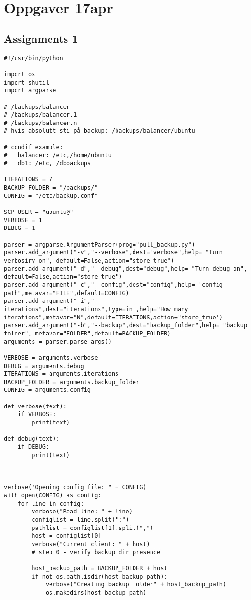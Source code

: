 \section{Oppgaver 17apr}

\subsection{Assignments 1} 
\begin{lstlisting}
#!/usr/bin/python

import os
import shutil
import argparse

# /backups/balancer
# /backups/balancer.1
# /backups/balancer.n
# hvis absolutt sti på backup: /backups/balancer/ubuntu

# condif example:
#   balancer: /etc,/home/ubuntu
#   db1: /etc, /dbbackups

ITERATIONS = 7
BACKUP_FOLDER = "/backups/"
CONFIG = "/etc/backup.conf"

SCP_USER = "ubuntu@"
VERBOSE = 1
DEBUG = 1

parser = argparse.ArgumentParser(prog="pull_backup.py")
parser.add_argument("-v","--verbose",dest="verbose",help= "Turn verbosiry on", default=False,action="store_true")
parser.add_argument("-d","--debug",dest="debug",help= "Turn debug on", default=False,action="store_true")
parser.add_argument("-c","--config",dest="config",help= "config path",metavar="FILE",default=CONFIG)
parser.add_argument("-i","--iterations",dest="iterations",type=int,help="How many iterations",metavar="N",default=ITERATIONS,action="store_true")
parser.add_argument("-b","--backup",dest="backup_folder",help= "backup folder", metavar="FOLDER",default=BACKUP_FOLDER)
arguments = parser.parse_args()

VERBOSE = arguments.verbose
DEBUG = arguments.debug
ITERATIONS = arguments.iterations
BACKUP_FOLDER = arguments.backup_folder
CONFIG = arguments.config

def verbose(text):
    if VERBOSE:
        print(text)

def debug(text):
    if DEBUG:
        print(text)



verbose("Opening config file: " + CONFIG)
with open(CONFIG) as config:
    for line in config:
        verbose("Read line: " + line)
        configlist = line.split(":")
        pathlist = configlist[1].split(",")
        host = configlist[0]
        verbose("Current client: " + host)
        # step 0 - verify backup dir presence

        host_backup_path = BACKUP_FOLDER + host
        if not os.path.isdir(host_backup_path):
            verbose("Creating backup folder" + host_backup_path)
            os.makedirs(host_backup_path)



\end{lstlisting}
